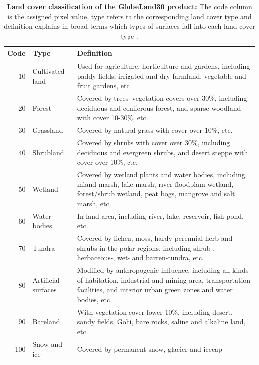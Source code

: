 		\begin{table}[ht]
			\centering
			\caption[Land cover classification of the GlobeLand30 product]{\textbf{Land cover classification of the GlobeLand30 product:} The code column is the assigned pixel value, type refers to the corresponding land cover type and definition explains in broad terms which types of surfaces fall into each land cover type \citep{Chen2017}.}
			\label{tab:gl30_classes}
			\begin{tabular}{rlp{10.3cm}}
				\hline
				Code & Type & Definition \\\hline
				10 & Cultivated land & Used for agriculture, horticulture and gardens, including paddy fields, irrigated and dry farmland, vegetable and fruit gardens, etc. \\
				20 & Forest & Covered by trees, vegetation covers over 30\%, including deciduous and coniferous forest, and sparse woodland with cover 10-30\%, etc. \\
				30 & Grassland & Covered by natural grass with cover over 10\%, etc.\\
				40 & Shrubland & Covered by shrubs with cover over 30\%, including deciduous and evergreen shrubs, and desert steppe with cover over 10\%, etc.\\
				50 & Wetland & Covered by wetland plants and water bodies, including inland marsh, lake marsh, river floodplain wetland, forest/shrub wetland, peat bogs, mangrove and salt marsh, etc.\\
				60 & Water bodies & In land area, including river, lake, reservoir, fish pond, etc.\\
				70 & Tundra & Covered by lichen, moss, hardy perennial herb and shrubs in the polar regions, including shrub-, herbaceous-, wet- and barren-tundra, etc.\\
				80 & Artificial surfaces & Modified by anthropogenic influence, including all kinds of habitation, industrial and mining area, transportation facilities, and interior urban green zones and water bodies, etc.\\
				90 & Bareland & With vegetation cover lower 10\%, including desert, sandy fields, Gobi, bare rocks, saline and alkaline land, etc.\\
				100 & Snow and ice & Covered by permanent snow, glacier and icecap\\\hline
			\end{tabular}
	\end{table}

